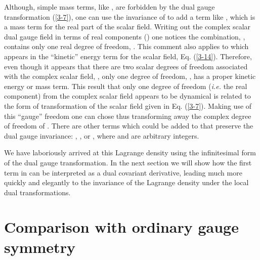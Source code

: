 \documentclass[a4paper,aps]{revtex4}
\begin{document}
Although, simple mass terms, like \coordHE{}, are
forbidden by the dual gauge
transformation (\ref{3-7}), one can use the invariance
of \myHighlight{$\phi + \phi ^{\ast}$}\coordHE{} to add a term like
\coordHE{}, which is a mass term for
the real part of the scalar field. Writing out the complex scalar dual
gauge field in terms of real components (\coordHE{})
one notices the  combination, \myHighlight{$(\phi + \phi ^{\ast})$}\coordHE{}, contains
only one real degree of freedom, \coordHE{}. This comment also
applies to \myHighlight{$\partial _{\mu} \phi + \partial _{\mu}
\phi ^{\ast}$}\coordHE{} which appears in the ``kinetic'' energy term
for the scalar field, Eq. (\ref{3-14}). Therefore, even though it
appears that there are two scalar degrees of freedom associated with
the complex scalar field, \myHighlight{$\phi$}\coordHE{}, only one degree of freedom,
\coordHE{}, has a proper kinetic energy or mass term. This
result that only one degree of freedom ({\it i.e.} the real
component) from the complex scalar field appears to be dynamical
is related to the form of transformation of the scalar field
given in Eq. (\ref{3-7}). Making use of this ``gauge'' freedom
one can chose \coordHE{} thus transforming away
the complex degree of freedom of \myHighlight{$\phi$}\coordHE{}.
There are other terms which could be added to \coordHE{} that
preserve the dual gauge invariance: \coordHE{}, \coordHE{}, or
\coordHE{}, where \coordHE{} and \coordHE{}
are arbitrary integers.

We have laboriously arrived at this Lagrange density
using the infinitesimal form of the dual gauge transformation.
In the next section we will show how the first term in
\coordHE{} can be interpreted as a dual covariant
derivative, leading much more quickly
and elegantly to the invariance of the Lagrange density under the
local dual transformations.

\section{Comparison with ordinary gauge symmetry}
\end{document}

